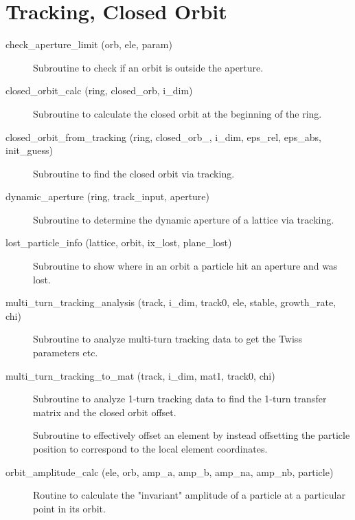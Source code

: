 \section{Tracking, Closed Orbit}
\label{r:track}    

\begin{description}

\item[check\_aperture\_limit (orb, ele, param)] \Newline
Subroutine to check if an orbit is outside the aperture. 

\item[closed\_orbit\_calc (ring, closed\_orb, i\_dim)] \Newline 
Subroutine to calculate the closed orbit at the beginning of the ring.

\item[closed\_orbit\_from\_tracking (ring, closed\_orb\_, i\_dim, 
eps\_rel, eps\_abs, init\_guess)] \Newline
Subroutine to find the closed orbit via tracking. 

\item[dynamic\_aperture (ring, track\_input, aperture)] \Newline
Subroutine to determine the dynamic aperture of a lattice via tracking. 

\item[lost\_particle\_info (lattice, orbit, ix\_lost, plane\_lost)] \Newline 
Subroutine to show where in an orbit a particle hit an aperture and was lost.

\item[multi\_turn\_tracking\_analysis (track, i\_dim, track0, ele, 
stable, growth\_rate, chi)] \Newline
Subroutine to analyze multi-turn tracking data to get the Twiss
parameters etc.

\item[multi\_turn\_tracking\_to\_mat (track, i\_dim, 
mat1, track0, chi)] \Newline
Subroutine to analyze 1-turn tracking data to find the 1-turn transfer
matrix and the closed orbit offset.

\item[\protect\parbox{6in}{offset\_particle (ele, param, coord, set, 
set\_canonical, \\
\hspace*{2in} set\_tilt, set\_multipoles, set\_hvkicks, s\_pos)}] \Newline
Subroutine to effectively offset an element by instead offsetting 
the particle position to correspond to the local element coordinates. 

\item[orbit\_amplitude\_calc (ele, orb, amp\_a, amp\_b, amp\_na, amp\_nb, particle)] \Newline
Routine to calculate the "invariant" amplitude of a particle at a 
particular point in its orbit. 


\end{description}
